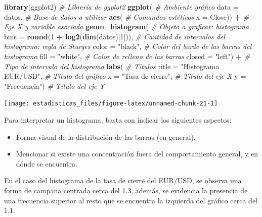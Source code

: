 \documentclass[
  11pt,
]{book}
\newenvironment{Shaded}{\begin{snugshade}}{\end{snugshade}}
\newcommand{\AttributeTok}[1]{\textcolor[rgb]{0.13,0.29,0.53}{#1}}
\newcommand{\CommentTok}[1]{\textcolor[rgb]{0.56,0.35,0.01}{\textit{#1}}}
\newcommand{\DecValTok}[1]{\textcolor[rgb]{0.00,0.00,0.81}{#1}}
\newcommand{\FunctionTok}[1]{\textcolor[rgb]{0.13,0.29,0.53}{\textbf{#1}}}
\newcommand{\NormalTok}[1]{#1}
\newcommand{\SpecialCharTok}[1]{\textcolor[rgb]{0.81,0.36,0.00}{\textbf{#1}}}
\newcommand{\StringTok}[1]{\textcolor[rgb]{0.31,0.60,0.02}{#1}}
\providecommand{\tightlist}{%
  \setlength{\itemsep}{0pt}\setlength{\parskip}{0pt}}
\theoremstyle{definition}
\theoremstyle{definition}
\theoremstyle{definition}
\theoremstyle{definition}
\theoremstyle{remark}
\begin{document}
\begin{Shaded}
\begin{Highlighting}[]
\FunctionTok{library}\NormalTok{(ggplot2) }\CommentTok{\# Librería de ggplot2}
\FunctionTok{ggplot}\NormalTok{( }\CommentTok{\# Ambiente gráfico}
  \AttributeTok{data =}\NormalTok{ datos, }\CommentTok{\# Base de datos a utilizar}
       \FunctionTok{aes}\NormalTok{( }\CommentTok{\# Comandos estéticos}
         \AttributeTok{x =}\NormalTok{ Close)) }\SpecialCharTok{+} \CommentTok{\# Eje X y variable asociada }
  \FunctionTok{geom\_histogram}\NormalTok{( }\CommentTok{\# Objeto a graficar: histograma}
    \AttributeTok{bins =} \FunctionTok{round}\NormalTok{(}\DecValTok{1} \SpecialCharTok{+} \FunctionTok{log2}\NormalTok{(}\FunctionTok{dim}\NormalTok{(datos)[}\DecValTok{1}\NormalTok{])), }\CommentTok{\# Cantidad de intervalos del histograma: regla de Sturges}
    \AttributeTok{color =} \StringTok{"black"}\NormalTok{, }\CommentTok{\# Color del borde de las barras del histograma}
    \AttributeTok{fill =} \StringTok{"white"}\NormalTok{, }\CommentTok{\# Color de relleno de las barras}
    \AttributeTok{closed =} \StringTok{"left"}\NormalTok{) }\SpecialCharTok{+} \CommentTok{\# Tipo de intervalo del histograma}
  \FunctionTok{labs}\NormalTok{( }\CommentTok{\# Títulos}
    \AttributeTok{title =} \StringTok{"Histograma EUR/USD"}\NormalTok{, }\CommentTok{\# Título del gráfico}
    \AttributeTok{x =} \StringTok{"Tasa de cierre"}\NormalTok{, }\CommentTok{\# Título del eje X}
    \AttributeTok{y =} \StringTok{"Frecuencia"}\NormalTok{) }\CommentTok{\# Título del eje Y}
\end{Highlighting}
\end{Shaded}

\begin{center}\texttt{[image: estadisticas\_files/figure-latex/unnamed-chunk-21-1]} \end{center}

Para interpretar un histograma, basta con indicar los siguientes aspectos:

\begin{itemize}
\tightlist
\item
  Forma visual de la distribución de las barras (en general).
\item
  Mencionar si existe una concentración fuera del comportamiento general, y en dónde se encuentra.
\end{itemize}

En el caso del histograma de la tasa de cierre del EUR/USD, se observa una forma de campana centrada cerca del 1.3, además, se evidencia la presencia de una frecuencia superior al resto que se encuentra la izquierda del gráfico cerca del 1.1.
\end{document}
